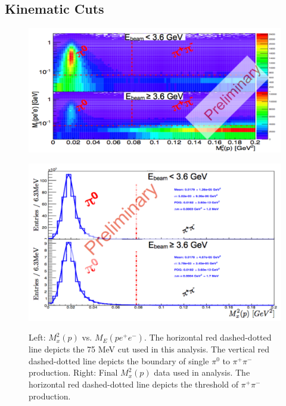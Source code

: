 \documentclass{aip-cp}
\begin{document}
\subsection{Kinematic Cuts}
\begin{figure}[h!]
	\centering
	\begin{minipage}{.50\textwidth}
		\centering
		\includegraphics[width=225 pt, height = 150 pt]{figures/pi0_ME_vs_Mx.pdf}
		\caption{}{}
		\label{fig:Mx_ME}
	\end{minipage}%
	\centering
	\begin{minipage}{.50\textwidth}
		\centering
		\includegraphics[width=225 pt, height = 150 pt]{figures/pi0_spectrum.pdf}
		\caption{Left: $M_x^2 (p)$ vs. $M_E(pe^+e^-)$. The horizontal red dashed-dotted line depicts the 75 MeV cut used in this analysis. The vertical red dashed-dotted line depicts the boundary of single $\pi^0$ to $\pi^{+}\pi^{-}$ production. Right: Final $M_x^2(p)$ data used in analysis. The horizontal red dashed-dotted line depicts the threshold of $\pi^{+}\pi^{-}$ production.}{}
		\label{fig:Mxp}
	\end{minipage}
\end{figure}
\end{document}
